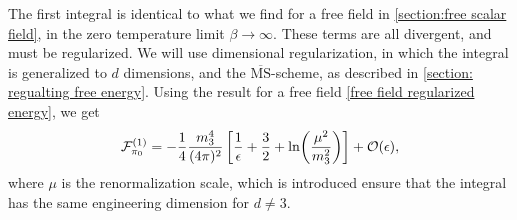 The first integral is identical to what we find for a free field in \autoref{section:free scalar field}, in the zero temperature limit $\beta \rightarrow \infty$.
These terms are all divergent, and must be regularized. 
We will use dimensional regularization, in which the integral is generalized to $d$ dimensions, and the $\overline{\mathrm{MS}}$-scheme, as described in \autoref{section: regualting free energy}.
Using the result for a free field \cref{free field regularized energy}, we get
\begin{equation}
    \mathcal{F}^{(1)}_{\pi_0} 
    = 
    - \frac{1}{4} \frac{m_3^4}{(4\pi)^2} 
    \left[ \frac{1}{\epsilon} + \frac{3}{2} + \ln(\frac{\mu^2}{m_3^2}) \right] + \mathcal{O}(\epsilon),
\end{equation}
where $\mu$ is the renormalization scale, which is introduced ensure that the integral has the same engineering dimension for $d \neq 3$.

